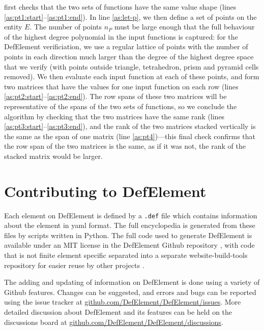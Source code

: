 \documentclass[sn-mathphys-num]{sn-jnl}%
\theoremstyle{thmstyleone}%
\theoremstyle{thmstyletwo}%
\theoremstyle{thmstylethree}%
\begin{document}
 first checks that the two sets of functions have the same value shape
(lines \ref{as:pt1:start}--\ref{as:pt1:end}).
In line \ref{as:let-p}, we then define a set of points on the entity $E$. The number of points
$n_P$ must be large enough that the full behaviour of the highest degree polynomial in the input
functions is captured: for the DefElement verificiation, we use a regular lattice of points with
the number of points in each direction much larger than the degree of the highest degree space
that we verify (with points outside triangle, tetrahedron, prism and pyramid cells removed).
We then evaluate each input function at each of these points, and form two matrices that have
the values for one input function on each row
(lines \ref{as:pt2:start}--\ref{as:pt2:end}).
The row spans of these two matrices will be representative of the spans of the two sets of functions,
so we conclude the algorithm by checking that the two matrices have the same rank
(lines \ref{as:pt3:start}--\ref{as:pt3:end}),
and the rank of the two matrices stacked vertically is the same as the span of one matrix
(line \ref{as:pt4})---this final check confirms that the row span of the two matrices is the same,
as if it was not, the rank of the stacked matrix would be larger.

\section{Contributing to DefElement}\label{sec:editing}
Each element on DefElement is defined by a \texttt{.def} file which contains information about the element in yaml format.
The full encyclopedia is generated from these files by scripts written in Python. The full code used to generate DefElement is available under an MIT
license in the DefElement Github repository \cite{defelement-github}, with code that is not finite element specific separated into a
separate website-build-tools repository for easier reuse by other projects \cite{website-build-tools-github}.

The adding and updating of information on DefElement is done using a variety of Github features.
Changes can be suggested, and errors and bugs can be reported using the issue tracker at \href{https://github.com/DefElement/DefElement/issues}{github.com/DefElement/DefElement/issues}.
More detailed discussion about DefElement and its features can be held on the discussions board at \href{https://github.com/DefElement/DefElement/discussions}{github.com/DefElement/DefElement/discussions}.
\end{document}
